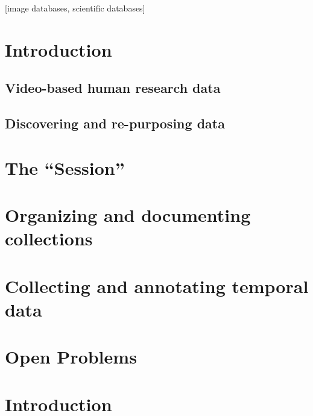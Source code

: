 \documentclass{sig-alternate}
\begin{document}
[image
databases, scientific databases]



\section{Introduction}

\subsection{Video-based human research data}

\subsection{Discovering and re-purposing data}

\section{The ``Session''}

\section{Organizing and documenting collections}

\section{Collecting and annotating temporal data}

\section{Open Problems}



\section{Introduction}
\end{document}
